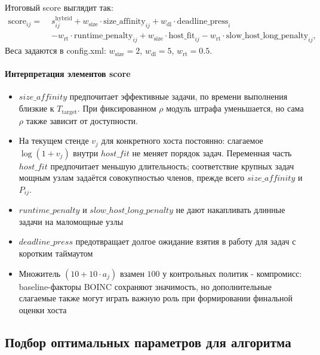 \documentclass[a4paper,12pt]{extarticle}
\begin{document}
Итоговый score выглядит так:
\begin{align*}
    \text{score}_{ij} =\;& s^{\text{hybrid}}_{ij}
        + w_{\text{size}} \cdot \text{size\_affinity}_{ij}
        + w_{\text{dl}} \cdot \text{deadline\_press}_i \\
        & - w_{\text{rt}} \cdot \text{runtime\_penalty}_{ij}
        + w_{\text{size}} \cdot \text{host\_fit}_{ij}
        - w_{\text{rt}} \cdot \text{slow\_host\_long\_penalty}_{ij},
\end{align*}
Веса задаются в config.xml: $w_{\text{size}}=2$, $w_{\text{dl}}=5$, $w_{\text{rt}}=0.5$.

\paragraph{Интерпретация элементов score}
\begin{itemize}
    \item $size\_affinity$ предпочитает эффективные задачи, по времени выполнения близкие к $T_{\mathrm{target}}$. При фиксированном $\rho$ модуль штрафа уменьшается, но сама $\rho$ также зависит от доступности.
    \item На текущем стенде $v_j$ для конкретного хоста постоянно: слагаемое $\log(1+v_j)$ внутри $host\_fit$ не меняет порядок задач. Переменная часть $host\_fit$ предпочитает меньшую длительность; соответствие крупных задач мощным узлам задаётся совокупностью членов, прежде всего $size\_affinity$ и $P_{ij}$.
   \item $runtime\_penalty$ и $slow\_host\_long\_penalty$ не дают накапливать длинные задачи на маломощные узлы
    \item $deadline\_press$ предотвращает долгое ожидание взятия в работу для задач с коротким таймаутом
    \item Множитель $(10 + 10\cdot a_j)$ взамен $100$ у контрольных политик - компромисс: baseline-факторы BOINC сохраняют значимость, но дополнительные слагаемые также могут играть важную роль при формировании финальной оценки хоста
\end{itemize}

\subsection{Подбор оптимальных параметров для алгоритма}
\end{document}
